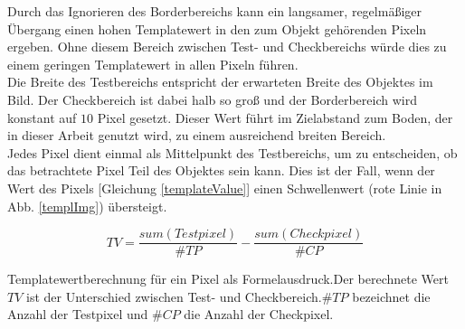 Durch das Ignorieren des Borderbereichs kann ein langsamer, regelmäßiger Übergang einen hohen Templatewert in den zum Objekt gehörenden Pixeln ergeben. Ohne diesem Bereich zwischen Test- und Checkbereichs würde dies zu einem geringen Templatewert in allen Pixeln führen.\\
Die Breite des Testbereichs entspricht der erwarteten Breite des Objektes im Bild. Der Checkbereich ist dabei halb so groß und der Borderbereich wird konstant auf $10$ Pixel gesetzt. Dieser Wert führt im Zielabstand zum Boden, der in dieser Arbeit genutzt wird, zu einem ausreichend breiten Bereich.\\
Jedes Pixel dient einmal als Mittelpunkt des Testbereichs, um zu entscheiden, ob das betrachtete Pixel Teil des Objektes sein kann. Dies ist der Fall, wenn der Wert des Pixels [Gleichung \ref{templateValue}] einen Schwellenwert (rote Linie in Abb. \ref{templImg}) übersteigt.\\

\begin{ownequation}[H]
\begin{equation}
TV = \frac{sum(Testpixel)}{\#TP} - \frac{sum(Checkpixel)}{\#CP}
\end{equation}
\caption[Templatewertberechnung für ein Pixel als Formelausdruck]{Templatewertberechnung für ein Pixel als Formelausdruck.Der berechnete Wert $TV$ ist der Unterschied zwischen Test- und Checkbereich.$\#TP$ bezeichnet die Anzahl der Testpixel und $\#CP$ die Anzahl der Checkpixel.}
\label{templateValue}
\end{ownequation}

\newpage
